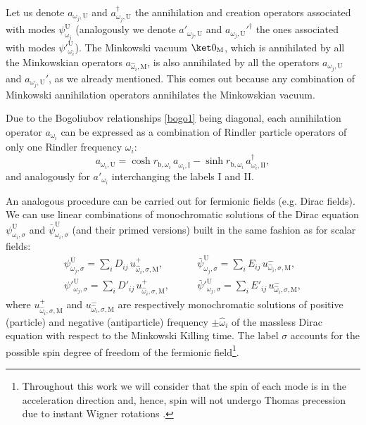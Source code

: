 Let us denote ${a_{\omega_j,\text{U}}}$ and $a_{\omega_j,\text{U}}^\dagger$ the
annihilation and creation operators associated with modes
$\psi^\text{U}_{\omega_j}$ (analogously we denote ${a'_{\omega_j,\text{U}}}$ and $a_{\omega_j,\text{U}}'^\dagger$ the ones associated with modes $\psi'^{\text{U}}_{\omega_i}$). The Minkowski vacuum
$\ket0_\text{M}$, which is annihilated by all the Minkowskian operators
$a_{\hat \omega_i,\text{M}}$, is also annihilated by all the operators
$a_{\omega_j,\text{U}}$ and $a_{\omega_j,\text{U}}'$, as we already mentioned. This comes out because any
combination of Minkowski annihilation operators annihilates the
Minkowskian vacuum.

Due to the Bogoliubov relationships \eqref{bogo1} being diagonal, each annihilation
operator $a_{\omega_i}$ can be expressed as a combination of Rindler
particle operators of only one Rindler frequency  $\omega_i$:
\begin{equation}\label{buenmod}
a_{\omega_i,\text{U}}=\cosh r_{\text{b},\omega_i}\, a^{\phantom{\dagger}}_{\omega_i,\text{I}}-
\sinh r_{\text{b},\omega_i}\,a^\dagger_{\omega_i,\text{II}},
\end{equation}
and analogously for $a'_{\omega_i}$ interchanging the labels I and II.

An analogous procedure can be carried out for fermionic fields (e.g. Dirac
fields). We can use linear combinations of monochromatic solutions of the
Dirac equation $\psi^\text{U}_{\omega_i,\sigma}$ and $\bar
\psi^\text{U}_{\omega_i,\sigma}$ (and their primed versions) built in the same fashion as for scalar
fields:
\begin{align}\label{modopsif}
\psi^\text{U}_{\omega_j,\sigma}=\sum_i D_{ij}\, u_{\hat\omega_i,\sigma,\text{M}}^{+},
&\qquad \bar \psi^\text{U}_{\omega_j,\sigma}=\sum_i E_{ij}\, u_{\hat\omega_i,\sigma,\text{M}}^{-},\nonumber\\
\psi'^{\text{U}}_{\omega_j,\sigma}=\sum_i D'_{ij}\, u_{\hat\omega_i,\sigma,\text{M}}^{+},
& \qquad\bar\psi'^{\text{U}}_{\omega_j,\sigma}=\sum_i E'_{ij}\, u_{\hat\omega_i,\sigma,\text{M}}^{-},
\end{align}
where $u^+_{\hat\omega_i,\sigma,\text{M}}$ and
$u^-_{\hat\omega_i,\sigma,\text{M}}$ are respectively monochromatic
solutions of positive (particle) and negative (antiparticle) frequency $\pm\hat\omega_i$ of the
massless Dirac equation with respect to the Minkowski Killing time. The
label $\sigma$ accounts for the possible spin degree of freedom of the
fermionic field\footnote{Throughout this work we will consider that the
spin of each mode is in the acceleration direction and, hence, spin will not
undergo Thomas precession due to instant Wigner rotations
\cite{AlsingSchul,Jauregui}.}.

